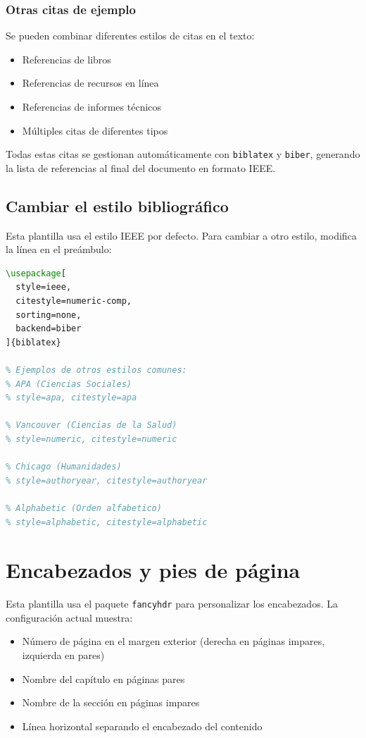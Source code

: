 \subsubsection{Otras citas de ejemplo}
Se pueden combinar diferentes estilos de citas en el texto:
\begin{itemize}
  \item Referencias de libros~\cite{Apellido1997}
  \item Referencias de recursos en línea~\cite{Organizacion2023}
  \item Referencias de informes técnicos~\cite{Organismo2001}
  \item Múltiples citas de diferentes tipos~\cites{Apellido1997,Organizacion2023,Organismo2001}
\end{itemize}
Todas estas citas se gestionan automáticamente con \texttt{biblatex} y \texttt{biber}, generando la lista de referencias al final del documento en formato IEEE.

\subsection{Cambiar el estilo bibliográfico}
Esta plantilla usa el estilo IEEE por defecto. Para cambiar a otro estilo, modifica la línea en el preámbulo:
\begin{lstlisting}[language=TeX, caption={Configuración del estilo bibliográfico}]
% Estilo actual (IEEE)
\usepackage[
  style=ieee,
  citestyle=numeric-comp,
  sorting=none,
  backend=biber
]{biblatex}

% Ejemplos de otros estilos comunes:
% APA (Ciencias Sociales)
% style=apa, citestyle=apa

% Vancouver (Ciencias de la Salud)
% style=numeric, citestyle=numeric

% Chicago (Humanidades)
% style=authoryear, citestyle=authoryear

% Alphabetic (Orden alfabetico)
% style=alphabetic, citestyle=alphabetic
\end{lstlisting}

\section{Encabezados y pies de página}
Esta plantilla usa el paquete \texttt{fancyhdr} para personalizar los encabezados. La configuración actual muestra:
\begin{itemize}
  \item Número de página en el margen exterior (derecha en páginas impares, izquierda en pares)
  \item Nombre del capítulo en páginas pares
  \item Nombre de la sección en páginas impares
  \item Línea horizontal separando el encabezado del contenido
\end{itemize}


